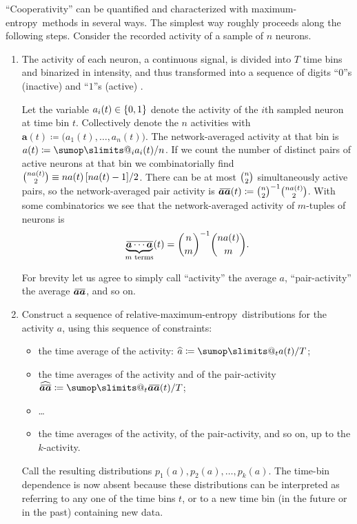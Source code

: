 \documentclass[\ifafour a4paper,12pt,\else a5paper,10pt,\fi%
onecolumn,oneside,article,%
british%
]{memoir}
\makeatletter
\theoremstyle{remark}
\theoremstyle{innote}
\def\sum{\DOTSI\sumop\slimits@}
\newcommand*{\citep}{\parencites}
\newcommand*{\defd}{\coloneqq}
\DeclarePairedDelimiter\set{\{}{\}}
\renewcommand*{\|}{\nonscript\,\vert\nonscript\;\mathopen{}}
\newcommand*{\cf}{{cf.}}
\newcommand*{\widebar}[1]{{\mkern1.5mu\skew{2}\overline{\mkern-1.5mu#1\mkern-1.5mu}\mkern 1.5mu}}
\newcommand*{\tav}{\widehat} %
\newcommand*{\av}{\widebar} %
\newcommand*{\yav}{a}
\newcommand*{\yaa}{\bm{\yav}}%
\newcommand*{\ya}{\yav}%
\newcommand*{\me}{maximum-entropy}
\makeatother
\begin{document}
\enquote{Cooperativity} can be quantified and characterized with \me\
methods in several ways. The simplest way roughly proceeds along the
following steps. Consider the recorded activity of a sample of $n$ neurons.
\begin{enumerate}
\item The activity of each neuron, a continuous signal, is divided into $T$
  time bins and binarized in intensity, and thus transformed into a
  sequence of digits \enquote{$0$}s (inactive) and \enquote{$1$}s (active)
  \citep[\cf][]{caianiello1961,caianiello1986}.

  Let the variable $\yav_i(t)\in\set{0,1}$ denote the activity of the $i$th
  sampled neuron at time bin $t$. Collectively denote the $n$ activities
  with $\yaa(t) \defd \bigl(\yav_1(t),\dotsc,\yav_n(t)\bigr)$. The
  network-averaged activity at that bin is
  $\ya(t) \defd \sum_i \yav_i(t)/n$. If we count the number of distinct
  pairs of active neurons at that bin we combinatorially find
  $\tbinom{n\ya(t)}{2}\equiv n\ya(t)\,[n\ya(t)-1]/2$. There can be at
  most $\tbinom{n}{2}$ simultaneously active pairs, so the
  network-averaged pair activity is
  $\av{\yaa \yaa}(t) \defd \tbinom{n}{2}^{-1}\tbinom{n\ya(t)}{2}$. With some
  combinatorics we see that the network-averaged activity of $m$-tuples
  of neurons is
  \begin{equation}
    \label{eq:products_intermsof_average}
    \av{\underbrace{\yaa\dotsm\yaa}_{\text{$m$ terms}}}(t)
    = \binom{n}{m}^{-1}\binom{n\ya(t)}{m}.
  \end{equation}
  
  For brevity let us agree to simply call \enquote{activity} the average
  $\ya$, \enquote{pair-activity} the average $\av{\yaa \yaa}$, and so on.

\item Construct a sequence of relative-\me\ distributions for the activity
  $\ya$, using this sequence of constraints:
  \begin{itemize}
  \item the time average of the activity: $\tav{\ya} \defd \sum_t\ya(t)/T$;
  \item the time averages of the activity and of the pair-activity
    $\tav{\av{\yaa \yaa}} \defd \sum_t\av{\yaa \yaa}(t)/T$;
  \item \ldots
  \item the time averages of the activity, of the pair-activity, and so on, up
    to the $k$-activity.
  \end{itemize}
  Call the resulting distributions $p_1(\ya), p_2(\ya),\dotsc,p_k(\ya)$.
  The time-bin dependence is now absent because these distributions can be
  interpreted as referring to any one of the time bins $t$, or to a new
  time bin (in the future or in the past) containing new data.


\end{enumerate}
\end{document}

